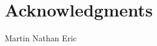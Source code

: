 \documentclass{sig-alternate}
\begin{document}
\section{Acknowledgments}
Martin
Nathan
Eric


%
%

\balancecolumns
\end{document}
